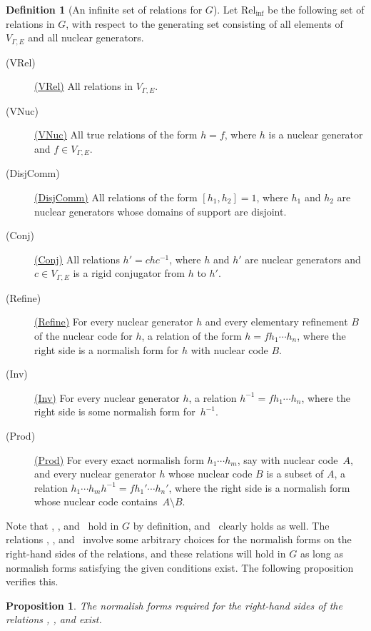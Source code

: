 \documentclass[11pt,letterpaper]{amsart}
\newtheorem{proposition}[theorem]{Proposition}
\theoremstyle{definition}
\newtheorem{definition}[theorem]{Definition}
\newcommand{\listlabel}[1]{%
  \item[\quad(#1)]\hypertarget{#1}{}\global\expandafter\def\csname #1\endcsname{\hyperlink{#1}{(#1)}}}
\begin{document}
\begin{definition}[An infinite set of relations for $G$]\label{def:RelInf}
Let $\mathrm{Rel}_{\mathrm{inf}}$ be the following set of relations in $G$, with respect to the generating set consisting of all elements of $V_{\Gamma,E}$ and all nuclear generators.
\begin{description}

\listlabel{VRel} All relations in $V_{\Gamma,E}$.\smallskip

\listlabel{VNuc} All true relations of the form $h=f$, where $h$ is a nuclear generator and $f\in V_{\Gamma,E}$. \smallskip

\listlabel{DisjComm} All relations of the form $[h_1,h_2]=1$, where $h_1$ and $h_2$ are nuclear generators whose domains of support are disjoint.\smallskip

\listlabel{Conj} All relations $h'=chc^{-1}$, where $h$ and $h'$ are  nuclear generators and $c\in V_{\Gamma,E}$ is a rigid conjugator from $h$ to $h'$.
\smallskip

\listlabel{Refine} For every nuclear generator $h$ and every elementary refinement $B$ of the nuclear code for $h$, a relation of the form $h=fh_1\cdots h_n$, where the right side is a normalish form for $h$ with nuclear code $B$.\smallskip

\listlabel{Inv} For every nuclear generator $h$, a relation $h^{-1}=fh_1\cdots h_n$, where the right side is some normalish form for~$h^{-1}$.\smallskip

\listlabel{Prod} For every exact normalish form $h_1\cdots h_m$, say with nuclear code~$A$, and every nuclear generator $h$ whose nuclear code $B$ is a subset of $A$, a relation $h_1\cdots h_mh^{-1}=fh_1'\cdots h_n'$, where the right side is a normalish form whose nuclear code contains~$A\setminus B$.
\end{description}
\end{definition}

Note that \VRel, \VNuc, and \Conj\ hold in $G$ by definition, and \DisjComm\ clearly holds as well. The relations \Refine, \Inv, and \Prod\ involve some arbitrary choices for the normalish forms on the right-hand sides of the relations, and these relations will hold in $G$ as long as normalish forms satisfying the given conditions exist.  The following proposition verifies this.

\begin{proposition}
The normalish forms required for the right-hand sides of the relations\/ {\normalfont\Refine}, {\normalfont\Inv}, and\/ {\normalfont\Prod} exist.
\end{proposition}
\end{document}
